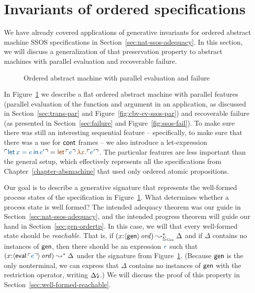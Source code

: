 \section{Invariants of ordered specifications}
\label{sec:gen-order}

We have already covered applications of generative invariants for
ordered abstract machine SSOS specifications in
Section~\ref{sec:nat-ssos-adequacy}. In this section, we will discuss
a generalization of that preservation property to abstract machines
with parallel evaluation and recoverable failure.  


\begin{figure}[t]
\caption{Ordered abstract machine with parallel evaluation and failure}
\label{fig:gen-order-prog}
\end{figure}

In Figure~\ref{fig:gen-order-prog} we describe a flat ordered abstract
machine with parallel features (parallel evaluation of the function
and argument in an application, as discussed in
Section~\ref{sec:trans-par} and Figure~\ref{fig:cbv-ev-ssos-par}) and
recoverable failure (as presented in Section~\ref{sec:failure} and
Figure~\ref{fig:ssos-fail}). To make sure there was still an
interesting sequential feature -- specifically, to make sure that
there was a use for ${\sf cont}$ frames -- we also introduce a
let-expression $\interp{{\sf let}\,x = e\,{\sf in}\,e'} = \lf{{\sf
    let}\,\interp{e}\,\lambda x.\interp{e'}}$. The particular features
are less important than the general setup, which effectively represents
all the specifications from Chapter~\ref{chapter-absmachine} that used
only ordered atomic propositions. 


Our goal is to describe a generative signature that represents the
well-formed process states of the specification in
Figure~\ref{fig:gen-order-prog}. What determines whether a process
state is well formed? The intended adequacy theorem was our guide in
Section~\ref{sec:nat-ssos-adequacy}, and the intended progress theorem
will guide our hand in Section~\ref{sec:gen-ordertp}. In this case, we
will that every well-formed state should be {\it reachable}. That is,
if $(x{:}{\langle {\sf gen} \rangle}\,{{\it ord}}) \leadsto^*_{\Sigma_{\it Gen}}
\Delta$ and if $\Delta$ contains no instances of ${\sf gen}$, then
there should be an expression $\obj{e}$ such that
$(x{:}\istrue{\susp{{\sf eval}\,\interp{e}}}) \leadsto^* \Delta$ under
the signature from Figure~\ref{fig:gen-order-prog}. (Because ${\sf
  gen}$ is the only nonterminal, we can express that $\Delta$ contains
no instances of ${\sf gen}$ with the restriction operator, writing
${\Delta}{\mbox{\lightning}}_{}$.) We will discuss the proof of this property
in Section~\ref{sec:well-formed-reachable}.

